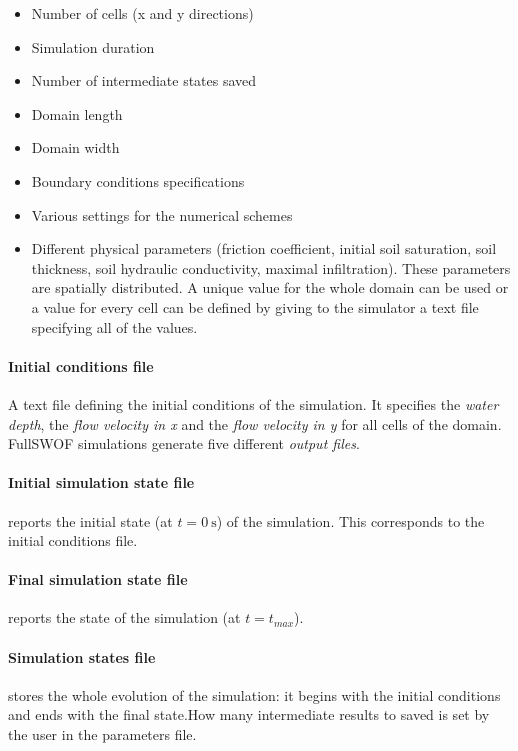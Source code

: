 \begin{itemize}
\itemsep0em
  \item Number of cells (x and y directions)
  \item Simulation duration
  \item Number of intermediate states saved
  \item Domain length
  \item Domain width
  \item Boundary conditions specifications
  \item Various settings for the numerical schemes
  \item Different physical parameters (friction coefficient, initial soil saturation, soil thickness, soil hydraulic conductivity, maximal infiltration). These parameters are spatially distributed. A unique value for the whole domain can be used or a value for every cell can be defined by giving to the simulator a text file specifying all of the values.\\
\end{itemize}

\paragraph{Initial conditions file} A text file defining the initial conditions of the simulation. It specifies the \emph{water depth}, the \emph{flow velocity in x} and the \emph{flow velocity in y} for all cells of the domain. \\ %

FullSWOF simulations generate five different \emph{output files}.
\paragraph{Initial simulation state file} reports the initial state (at $t = \SI{0}{\s}$) of the simulation. 
This corresponds to the initial conditions file.
\paragraph{Final simulation state file} reports the state of the simulation (at $t = t_{max}$).
\paragraph{Simulation states file} stores the whole evolution of the simulation: it begins with the initial conditions and ends with the final state.How many intermediate results to saved is set by the user in the parameters file.
